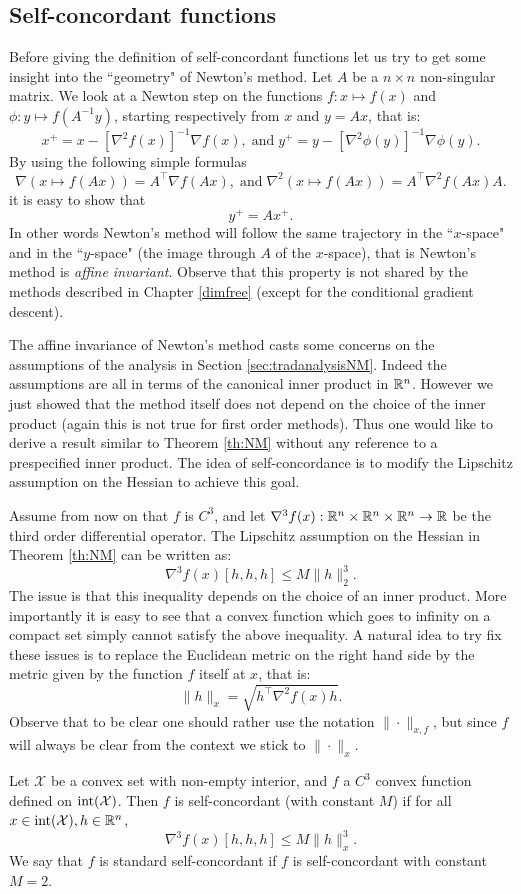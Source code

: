 \subsection{Self-concordant functions}
Before giving the definition of self-concordant functions let us try to get some insight into the ``geometry" of Newton's method. Let $A$ be a $n \times n$ non-singular matrix. We look at a Newton step on the functions $f: x \mapsto f(x)$ and $\phi: y \mapsto f(A^{-1} y)$, starting respectively from $x$ and $y= A x$, that is:
$$x^+ = x  - [\nabla^2 f(x)]^{-1} \nabla f(x) , \; \text{and} \; y^+ = y  - [\nabla^2 \phi(y)]^{-1} \nabla \phi(y) .$$
By using the following simple formulas
$$\nabla (x \mapsto f(A x) ) =A^{\top} \nabla f(A x) , \; \text{and} \; \nabla^2 (x \mapsto f(A x) ) =A^{\top} \nabla^2 f(A x) A .$$
it is easy to show that
$$y^+ = A x^+ .$$
In other words Newton's method will follow the same trajectory in the ``$x$-space" and in the ``$y$-space" (the image through $A$ of the $x$-space), that is Newton's method is {\em affine invariant}. Observe that this property is not shared by the methods described in Chapter \ref{dimfree} (except for the conditional gradient descent).

The affine invariance of Newton's method casts some concerns on the assumptions of the analysis in Section \ref{sec:tradanalysisNM}. Indeed the assumptions are all in terms of the canonical inner product in $\mathbb{R}^n$. However we just showed that the method itself does not depend on the choice of the inner product (again this is not true for first order methods). Thus one would like to derive a result similar to Theorem \ref{th:NM} without any reference to a prespecified inner product. The idea of self-concordance is to modify the Lipschitz assumption on the Hessian to achieve this goal.

Assume from now on that $f$ is $C^3$, and let $\nabla^3 f(x) : \mathbb{R}^n \times \mathbb{R}^n \times \mathbb{R}^n \rightarrow \mathbb{R}$ be the third order differential operator. The Lipschitz assumption on the Hessian in Theorem \ref{th:NM} can be written as:
$$\nabla^3 f(x) [h,h,h] \leq M \|h\|_2^3 .$$
The issue is that this inequality depends on the choice of an inner product. More importantly it is easy to see that a convex function which goes to infinity on a compact set simply cannot satisfy the above inequality. A natural idea to try fix these issues is to replace the Euclidean metric on the right hand side by the metric given by the function $f$ itself at $x$, that is:
$$\|h\|_x = \sqrt{ h^{\top} \nabla^2 f(x) h }.$$
Observe that to be clear one should rather use the notation $\|\cdot\|_{x, f}$, but since $f$ will always be clear from the context we stick to $\|\cdot\|_x$.
\begin{definition}
Let $\mathcal{X}$ be a convex set with non-empty interior, and $f$ a $C^3$ convex function defined on $\mathrm{int}(\mathcal{X})$. Then $f$ is self-concordant (with constant $M$) if for all $x \in \mathrm{int}(\mathcal{X}), h \in \mathbb{R}^n$,
$$\nabla^3 f(x) [h,h,h] \leq M \|h\|_x^3 .$$
We say that $f$ is standard self-concordant if $f$ is self-concordant with constant $M=2$.
\end{definition}

